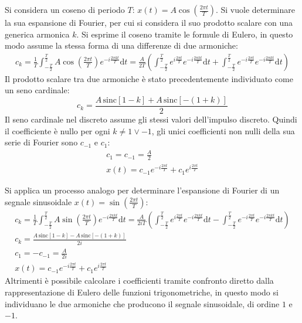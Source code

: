 \documentclass{article}
\newcommand{\sinc}{\mathrm{sinc}}
\newcommand{\df}{\mathrm{d}}
\numberwithin{equation}{subsection}
\begin{document}
Si considera un coseno di periodo $T$: $x(t)=A\cos\left(\frac{2\pi t}{T}\right)$. Si vuole determinare la sua espansione di Fourier, per cui si considera il suo prodotto 
scalare con una generica armonica $k$. Si esprime il coseno tramite le formule di Eulero, in questo modo assume la stessa forma di una differenze di due armoniche: 
\begin{gather*}
    c_k=\displaystyle\frac{1}{T}\int_{-\frac{T}{2}}^{\frac{T}{2}}A\cos\left(\frac{2\pi t}{T}\right)e^{-i\frac{2\pi kt}{T}}\df t=
    \frac{A}{2T}\left(\int_{-\frac{T}{2}}^{\frac{T}{2}}e^{i\frac{2\pi t}{T}}e^{-i\frac{2\pi kt}{T}}\df t+\int_{-\frac{T}{2}}^{\frac{T}{2}}e^{-i\frac{2\pi t}{T}}e^{-i\frac{2\pi kt}{T}}\df t\right)
\end{gather*}
Il prodotto scalare tra due armoniche è stato precedentemente individuato come un seno cardinale:
\begin{equation*}
    \displaystyle c_k=\frac{A\,\sinc[1-k]+A\,\sinc[-(1+k)]}{2}
\end{equation*}
Il seno cardinale nel discreto assume gli stessi valori dell'impulso discreto. 
Quindi il coefficiente è nullo per ogni $k\neq1\lor-1$, gli unici coefficienti non nulli della sua serie di Fourier sono $c_{-1}$ e $c_1$:
\begin{gather*}
    \displaystyle c_1=c_{-1}=\frac{A}{2}\\
    \displaystyle x(t)=c_{-1}e^{-i\frac{2\pi t}{T}}+c_1e^{i\frac{2\pi t}{T}}
\end{gather*}


Si applica un processo analogo per determinare l'espansione di Fourier di un segnale sinusoidale $x(t)=\sin\left(\frac{2\pi t}{T}\right)$:
\begin{gather*}
    c_k=\displaystyle\frac{1}{T}\int_{-\frac{T}{2}}^{\frac{T}{2}}A\sin\left(\frac{2\pi t}{T}\right)e^{-i\frac{2\pi kt}{T}}\df t=
    \frac{A}{2iT}\left(\int_{-\frac{T}{2}}^{\frac{T}{2}}e^{i\frac{2\pi t}{T}}e^{-i\frac{2\pi kt}{T}}\df t-\int_{-\frac{T}{2}}^{\frac{T}{2}}e^{-i\frac{2\pi t}{T}}e^{-i\frac{2\pi kt}{T}}\df t\right)\\
    \displaystyle c_k=\frac{A\,\sinc[1-k]-A\,\sinc[-(1+k)]}{2i}\\
    c_1=-c_{-1}=\frac{A}{2i}\\
    x(t)=c_{-1}e^{-i\frac{2\pi t}{T}}+c_1e^{i\frac{2\pi t}{T}}
\end{gather*}
Altrimenti è possibile calcolare i coefficienti tramite confronto diretto dalla rappresentazione di Eulero delle funzioni trigonometriche, in questo modo si individuano le due 
armoniche che producono il segnale sinusoidale, di ordine $1$ e $-1$. 
\end{document}
